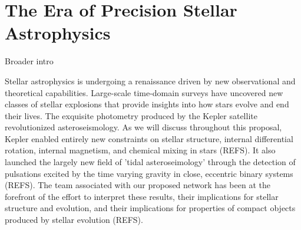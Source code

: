 \section{The Era of Precision Stellar Astrophysics}
Broader intro

Stellar astrophysics is undergoing a renaissance driven by new observational and theoretical capabilities.   Large-scale time-domain surveys have uncovered new classes of stellar explosions that provide insights into how stars evolve and end their lives.  The exquisite photometry produced by the Kepler satellite revolutionized asteroseismology.   As we will discuss throughout this proposal, Kepler enabled entirely new constraints on stellar structure, internal differential rotation, internal magnetism, and chemical mixing in stars (REFS).  It also launched the largely new field of 'tidal asteroseimology' through the detection of pulsations excited by the time varying gravity in close, eccentric binary systems (REFS). The team associated with our proposed network has been at the forefront of the effort to interpret these results, their implications for stellar structure and evolution, and their implications for properties of compact objects produced by stellar evolution (REFS).   


